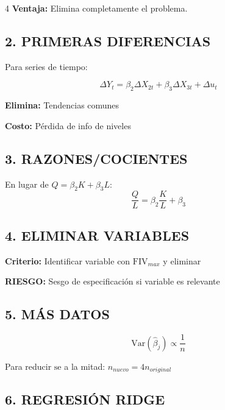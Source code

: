 \documentclass[6pt, landscape]{extarticle}
\newcommand{\Var}{\text{Var}}
\newcommand{\FIV}{\text{FIV}}
\begin{document}
\begin{multicols*}{4}
\textbf{Ventaja:} Elimina completamente el problema.

\subsection{2. PRIMERAS DIFERENCIAS}

Para series de tiempo:
\begin{formulabox}
\vspace{-3pt}
$$\Delta Y_t = \beta_2 \Delta X_{2t} + \beta_3 \Delta X_{3t} + \Delta u_t$$
\vspace{-3pt}
\end{formulabox}

\textbf{Elimina:} Tendencias comunes

\textbf{Costo:} Pérdida de info de niveles

\subsection{3. RAZONES/COCIENTES}

En lugar de $Q = \beta_2 K + \beta_3 L$:
$$\frac{Q}{L} = \beta_2 \frac{K}{L} + \beta_3$$

\subsection{4. ELIMINAR VARIABLES}

\textbf{Criterio:} Identificar variable con $\FIV_{max}$ y eliminar

\begin{warningbox}
\textbf{RIESGO:} Sesgo de especificación si variable es relevante
\end{warningbox}

\subsection{5. MÁS DATOS}

\begin{formulabox}
\vspace{-3pt}
$$\Var(\hat{\beta}_j) \propto \frac{1}{n}$$
\vspace{-3pt}
\end{formulabox}

Para reducir $\text{se}$ a la mitad: $n_{nuevo} = 4n_{original}$

\subsection{6. REGRESIÓN RIDGE}


\end{multicols*}
\end{document}
